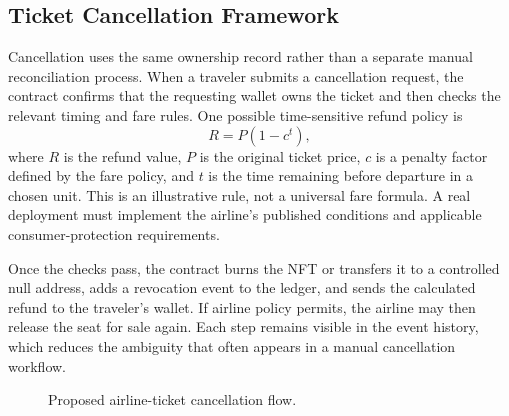 \documentclass[conference]{IEEEtran}
\begin{document}
\subsection{Ticket Cancellation Framework}
Cancellation uses the same ownership record rather than a separate manual reconciliation process. When a traveler submits a cancellation request, the contract confirms that the requesting wallet owns the ticket and then checks the relevant timing and fare rules. One possible time-sensitive refund policy is
\begin{equation}
R = P\left(1-c^{t}\right),
\label{eq:refund}
\end{equation}
where $R$ is the refund value, $P$ is the original ticket price, $c$ is a penalty factor defined by the fare policy, and $t$ is the time remaining before departure in a chosen unit. This is an illustrative rule, not a universal fare formula. A real deployment must implement the airline's published conditions and applicable consumer-protection requirements.

Once the checks pass, the contract burns the NFT or transfers it to a controlled null address, adds a revocation event to the ledger, and sends the calculated refund to the traveler's wallet. If airline policy permits, the airline may then release the seat for sale again. Each step remains visible in the event history, which reduces the ambiguity that often appears in a manual cancellation workflow.

\begin{figure}[!t]
\centering
{}
\caption{Proposed airline-ticket cancellation flow.}
\label{fig:cancellation}
\end{figure}
\end{document}

